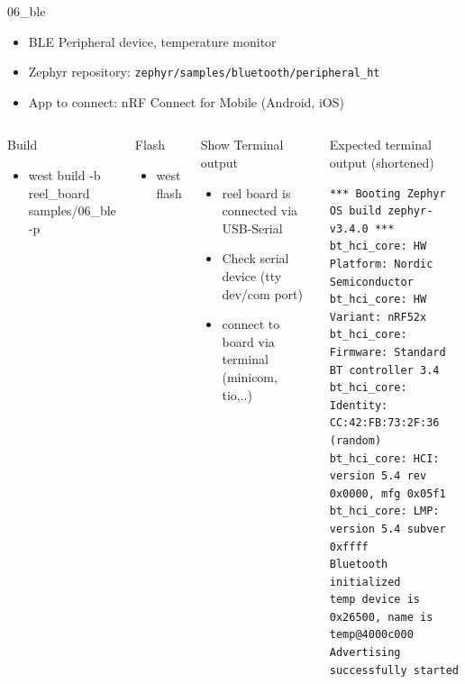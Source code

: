 \documentclass[10pt, aspectratio=169]{beamer}
\begin{document}
\begin{frame}[fragile]{06\_ble}

  \begin{itemize}
     \item BLE Peripheral device, temperature monitor
     \item Zephyr repository: \texttt{zephyr/samples/bluetooth/peripheral\_ht}
     \item App to connect: nRF Connect for Mobile (Android, iOS)
  \end{itemize}

  \begin{columns}[T,onlytextwidth]
      \begin{block}{Build}
        \begin{itemize}
          \item {\scriptsize west build -b reel\_board samples/06\_ble -p}
        \end{itemize}
      \end{block}

     \begin{block}{Flash}
        \begin{itemize}
          \item {\scriptsize west flash}
        \end{itemize}
      \end{block}

     \begin{block}{Show Terminal output}
        \begin{itemize}
	  \item {\scriptsize reel board is connected via USB-Serial}
	  \item {\scriptsize Check serial device (tty dev/com port)}
	  \item {\scriptsize connect to board via terminal (minicom, tio,..)}
        \end{itemize}
      \end{block}


      \begin{exampleblock}{Expected terminal output (shortened)}
        {\fontsize{7}{9.6}\selectfont
          \begin{verbatim}
*** Booting Zephyr OS build zephyr-v3.4.0 ***
bt_hci_core: HW Platform: Nordic Semiconductor
bt_hci_core: HW Variant: nRF52x
bt_hci_core: Firmware: Standard BT controller 3.4
bt_hci_core: Identity: CC:42:FB:73:2F:36 (random)
bt_hci_core: HCI: version 5.4 rev 0x0000, mfg 0x05f1
bt_hci_core: LMP: version 5.4 subver 0xffff
Bluetooth initialized
temp device is 0x26500, name is temp@4000c000
Advertising successfully started
          \end{verbatim}
        }
      \end{exampleblock}
  \end{columns}

\end{frame}
\end{document}
